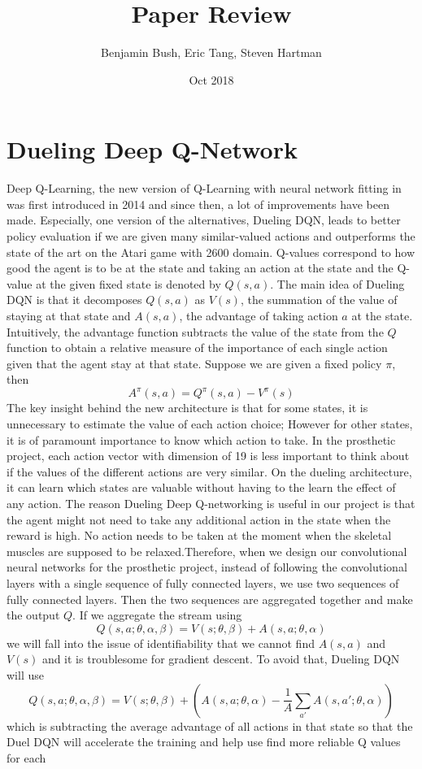 \documentclass[%
,aps%
 ,twocolumn%
 ,secnumarabic%
,amssymb, amsmath,nobibnotes, aps, prl, floatfix]{revtex4-1}
\begin{document}
\title{Paper Review}%
\author{Benjamin Bush, Eric Tang, Steven Hartman }%
\date{Oct 2018}%
\maketitle
\tableofcontents
\clearpage
\section{ Dueling Deep Q-Network}

Deep Q-Learning, the new version of Q-Learning with neural network fitting in was first introduced in 2014 and since then, a lot of improvements have been made. Especially, one version of the alternatives, Dueling DQN, leads to better policy evaluation if we are given many similar-valued actions and outperforms the state of the art on the Atari game with 2600 domain\cite{WSHHLF}. Q-values correspond to how good the agent is to be at the state and taking an action at the state and the Q-value at the given fixed state is denoted by $Q(s,a)$. The main idea of Dueling DQN is that it decomposes $Q(s,a)$ as $V(s)$, the summation of the value of staying at that state and $A(s,a)$, the advantage of taking action $a$ at the state. Intuitively, the advantage function subtracts the value of the state from the $Q$ function to obtain a relative measure of the importance of each single action given that the agent stay at that state. Suppose we are given a fixed policy $\pi$, then $$A^{\pi}(s,a) = Q^{\pi}(s,a) - V^{\pi}(s)$$ The key insight behind the new architecture is that for some states, it is unnecessary to estimate the value of each action choice; However for other states, it is of paramount importance to know which action to take\cite{WSHHLF}. In the prosthetic project, each action vector with dimension of 19 is less important to think about if the values of the different actions are very similar. On the dueling architecture, it can learn which states are valuable without having to the learn the effect of any action. The reason Dueling Deep Q-networking is useful in our project is that the agent might not need to take any additional action in the state when the reward is high. No action needs to be taken at the moment when the skeletal muscles are supposed to be relaxed.Therefore, when we design our convolutional neural networks for the prosthetic project, instead of following the convolutional layers with a single sequence of fully connected  layers, we use two sequences of fully connected layers. Then the two sequences are aggregated together and make the output $Q$. If we aggregate the stream using $$ Q(s,a;\theta,\alpha,\beta) = V(s;\theta,\beta) + A(s,a;\theta,\alpha) $$ we will fall into the issue of identifiability\cite{WSHHLF} that we cannot find $A(s,a)$ and $V(s)$ and it is troublesome for gradient descent. To avoid that, Dueling DQN will use $$Q(s,a;\theta,\alpha,\beta) = V(s;\theta,\beta) + (A(s,a;\theta,\alpha) - \frac{1}{A}\sum_{a'}{A(s,a';\theta,\alpha)})$$ which is subtracting the average advantage of all actions in that state so that the Duel DQN will accelerate the training and help use find more reliable Q values for each 
\end{document}
